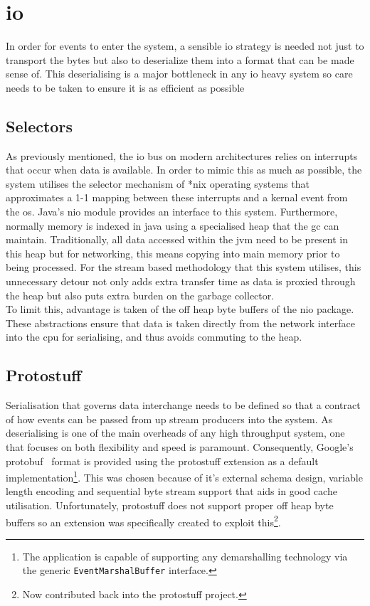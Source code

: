\documentclass[a4paper,11pt]{scrreprt}
\begin{document}
\section{\acrshort{io}}
In order for events to enter the system, a sensible \acrshort{io} strategy is needed not just to transport the bytes but also to deserialize them into a format that can be made sense of. This deserialising is a major bottleneck in any \acrshort{io} heavy system so care needs to be taken to ensure it is as efficient as possible
\subsection{Selectors}
As previously mentioned, the \acrshort{io} bus on modern architectures relies on interrupts that occur when data is available. In order to mimic this as much as possible, the system utilises the selector mechanism of *nix operating systems that approximates a 1-1 mapping between these interrupts and a kernal event from the \acrshort{os}. Java's \acrshort{nio} module provides an interface to this system. Furthermore, normally memory is indexed in java using a specialised heap that the \acrshort{gc} can maintain. Traditionally, all data accessed within the \acrshort{jvm} need to be present in this heap but for networking, this means copying into main memory prior to being processed. For the stream based methodology that this system utilises, this unnecessary detour not only adds extra transfer time as data is proxied through the heap but also puts extra burden on the garbage collector.\\
To limit this, advantage is taken of the off heap byte buffers of the \acrshort{nio} package. These abstractions ensure that data is taken directly from the network interface into the \acrshort{cpu} for serialising, and thus avoids commuting to the heap.
\subsection{Protostuff}
Serialisation that governs data interchange needs to be defined so that a contract of how events can be passed from up stream producers into the system. As deserialising is one of the main overheads of any high throughput system, one that focuses on both flexibility and speed is paramount. Consequently, Google's protobuf~\cite{googleprotobuf} format is provided using the protostuff extension as a default implementation\footnote{The application is capable of supporting any demarshalling technology via the generic \texttt{EventMarshalBuffer} interface.}. This was chosen because of it's external schema design, variable length encoding and sequential byte stream support that aids in good cache utilisation. Unfortunately, protostuff does not support proper off heap byte buffers so an extension was specifically created to exploit this\footnote{Now contributed back into the protostuff project.}.
\end{document}
